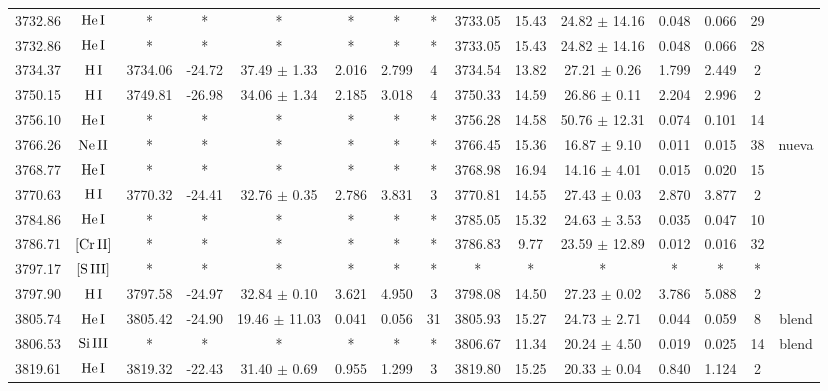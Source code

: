 \documentclass{article}
\begin{document}
\begin{table*}
\begin{adjustbox}{width=\textwidth}
\begin{tabular}{ccccccccccccccc}
3732.86 & $\mbox{He}\thinspace \mbox{I}$ & * & * & * & * & * & * & 3733.05 & 15.43 & 24.82 $\pm$ 14.16 & 0.048 & 0.066 & 29 &  \\
3732.86 & $\mbox{He}\thinspace \mbox{I}$ & * & * & * & * & * & * & 3733.05 & 15.43 & 24.82 $\pm$ 14.16 & 0.048 & 0.066 & 28 &  \\
3734.37 & $\mbox{H}\thinspace \mbox{I}$ & 3734.06 & -24.72 & 37.49 $\pm$ 1.33 & 2.016 & 2.799 & 4 & 3734.54 & 13.82 & 27.21 $\pm$ 0.26 & 1.799 & 2.449 & 2 &  \\
3750.15 & $\mbox{H}\thinspace \mbox{I}$ & 3749.81 & -26.98 & 34.06 $\pm$ 1.34 & 2.185 & 3.018 & 4 & 3750.33 & 14.59 & 26.86 $\pm$ 0.11 & 2.204 & 2.996 & 2 &  \\
3756.10 & $\mbox{He}\thinspace \mbox{I}$ & * & * & * & * & * & * & 3756.28 & 14.58 & 50.76 $\pm$ 12.31 & 0.074 & 0.101 & 14 &  \\
3766.26 & $\mbox{Ne}\thinspace \mbox{II}$ & * & * & * & * & * & * & 3766.45 & 15.36 & 16.87 $\pm$ 9.10 & 0.011 & 0.015 & 38 &  nueva \\
3768.77 & $\mbox{He}\thinspace \mbox{I}$ & * & * & * & * & * & * & 3768.98 & 16.94 & 14.16 $\pm$ 4.01 & 0.015 & 0.020 & 15 &  \\
3770.63 & $\mbox{H}\thinspace \mbox{I}$ & 3770.32 & -24.41 & 32.76 $\pm$ 0.35 & 2.786 & 3.831 & 3 & 3770.81 & 14.55 & 27.43 $\pm$ 0.03 & 2.870 & 3.877 & 2 &  \\
3784.86 & $\mbox{He}\thinspace \mbox{I}$ & * & * & * & * & * & * & 3785.05 & 15.32 & 24.63 $\pm$ 3.53 & 0.035 & 0.047 & 10 &  \\
3786.71 & $\mbox{[Cr}\thinspace \mbox{II]}$ & * & * & * & * & * & * & 3786.83 & 9.77 & 23.59 $\pm$ 12.89 & 0.012 & 0.016 & 32 &  \\
3797.17 & $\mbox{[S}\thinspace \mbox{III]}$ & * & * & * & * & * & * & * & * & * & * & * & * &  \\
3797.90 & $\mbox{H}\thinspace \mbox{I}$ & 3797.58 & -24.97 & 32.84 $\pm$ 0.10 & 3.621 & 4.950 & 3 & 3798.08 & 14.50 & 27.23 $\pm$ 0.02 & 3.786 & 5.088 & 2 &  \\
3805.74 & $\mbox{He}\thinspace \mbox{I}$ & 3805.42 & -24.90 & 19.46 $\pm$ 11.03 & 0.041 & 0.056 & 31 & 3805.93 & 15.27 & 24.73 $\pm$ 2.71 & 0.044 & 0.059 & 8 &  blend \\
3806.53 & $\mbox{Si}\thinspace \mbox{III}$ & * & * & * & * & * & * & 3806.67 & 11.34 & 20.24 $\pm$ 4.50 & 0.019 & 0.025 & 14 &  blend \\
3819.61 & $\mbox{He}\thinspace \mbox{I}$ & 3819.32 & -22.43 & 31.40 $\pm$ 0.69 & 0.955 & 1.299 & 3 & 3819.80 & 15.25 & 20.33 $\pm$ 0.04 & 0.840 & 1.124 & 2 &  \\

\end{tabular}
\end{adjustbox}
\end{table*}
\end{document}
